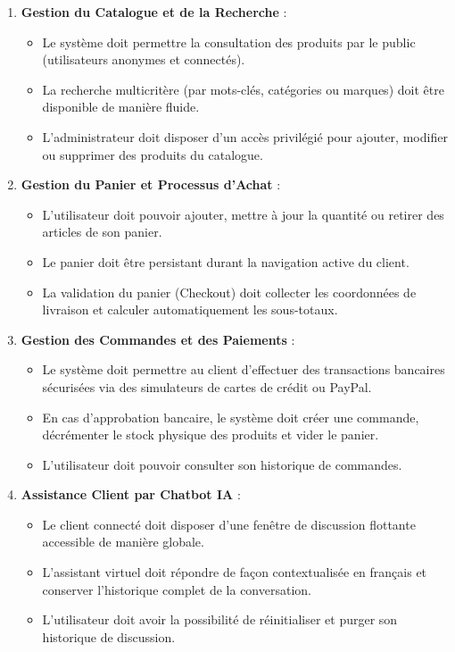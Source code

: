 \documentclass[12pt,a4paper,oneside]{report}
\begin{document}
\begin{enumerate}
    \item \textbf{Gestion du Catalogue et de la Recherche} :
    \begin{itemize}
        \item Le système doit permettre la consultation des produits par le public (utilisateurs anonymes et connectés).
        \item La recherche multicritère (par mots-clés, catégories ou marques) doit être disponible de manière fluide.
        \item L'administrateur doit disposer d'un accès privilégié pour ajouter, modifier ou supprimer des produits du catalogue.
    \end{itemize}
    \item \textbf{Gestion du Panier et Processus d'Achat} :
    \begin{itemize}
        \item L'utilisateur doit pouvoir ajouter, mettre à jour la quantité ou retirer des articles de son panier.
        \item Le panier doit être persistant durant la navigation active du client.
        \item La validation du panier (Checkout) doit collecter les coordonnées de livraison et calculer automatiquement les sous-totaux.
    \end{itemize}
    \item \textbf{Gestion des Commandes et des Paiements} :
    \begin{itemize}
        \item Le système doit permettre au client d'effectuer des transactions bancaires sécurisées via des simulateurs de cartes de crédit ou PayPal.
        \item En cas d'approbation bancaire, le système doit créer une commande, décrémenter le stock physique des produits et vider le panier.
        \item L'utilisateur doit pouvoir consulter son historique de commandes.
    \end{itemize}
    \item \textbf{Assistance Client par Chatbot IA} :
    \begin{itemize}
        \item Le client connecté doit disposer d'une fenêtre de discussion flottante accessible de manière globale.
        \item L'assistant virtuel doit répondre de façon contextualisée en français et conserver l'historique complet de la conversation.
        \item L'utilisateur doit avoir la possibilité de réinitialiser et purger son historique de discussion.
    \end{itemize}
\end{enumerate}
\end{document}
